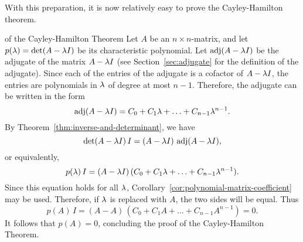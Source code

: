 With this preparation, it is now relatively easy to prove the
Cayley-Hamilton theorem.

\begin{proofof}{of the Cayley-Hamilton Theorem} Let $A$ be an
  $n\times n$-matrix, and let $p(\lambda)=\det(A-\lambda I)$ be
  its characteristic polynomial.  Let $\adj(A-\eigenvar I)$ be the
  adjugate of the matrix $A-\lambda I$ (see
  Section~\ref{sec:adjugate} for the definition of the
  adjugate). Since each of the entries of the adjugate is a cofactor
  of $A-\lambda I$, the entries are polynomials in $\lambda$ of
  degree at most $n-1$. Therefore, the adjugate can be written in the
  form
  \begin{equation*}
    \adj(A-\eigenvar I) = C_0 + C_1\eigenvar + \ldots + C_{n-1}\eigenvar^{n-1}.
  \end{equation*}
  By Theorem~\ref{thm:inverse-and-determinant}, we have
  \begin{equation*}
    \det(A-\eigenvar I)\,I = (A-\eigenvar I) \, \adj(A-\eigenvar I),
  \end{equation*}
  or equivalently,
  \begin{equation*}
    p(\lambda)\,I =
    (A-\lambda I)\,(C_0 + C_1\lambda + \ldots + C_{n-1}\lambda^{n-1}).
  \end{equation*}
  Since this equation holds for all $\lambda$,
  Corollary~\ref{cor:polynomial-matrix-coefficient} may be
  used. Therefore, if $\lambda$ is replaced with $A$, the two sides
  will be equal. Thus
  \begin{equation*}
    p(A)\,I = (A-A)\,(C_0 + C_1A + \ldots + C_{n-1}A^{n-1}) = 0.
  \end{equation*}
  It follows that $p(A)=0$, concluding the proof of the
  Cayley-Hamilton Theorem.
\end{proofof}

